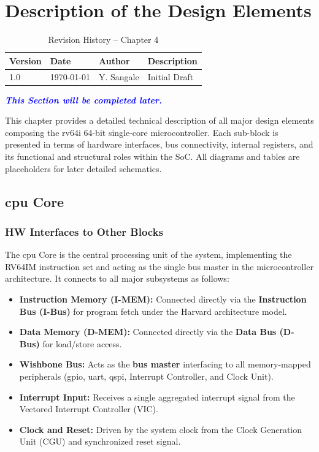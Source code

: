 \chapter{Description of the Design Elements}
\label{chap:design_elements}

\begin{table}[H]
\caption{Revision History – Chapter 4}
\centering
\begin{tabular}{llll}
\toprule
Version & Date & Author & Description \\
\midrule
1.0 & \today & Y. Sangale & Initial Draft \\
\bottomrule
\end{tabular}
\end{table}

\textcolor{blue}{\textbf{\textit{This Section will be completed later.}}}

This chapter provides a detailed technical description of all major design elements composing the \gls{rv64i}
64-bit single-core microcontroller.  
Each sub-block is presented in terms of hardware interfaces, bus connectivity, internal registers, 
and its functional and structural roles within the \gls{SoC}.  
All diagrams and tables are placeholders for later detailed schematics.

\section{\gls{cpu} Core}

\subsection{HW Interfaces to Other Blocks}
The \gls{cpu} Core is the central processing unit of the system, implementing the RV64IM instruction set
and acting as the single bus master in the microcontroller architecture.  
It connects to all major subsystems as follows:
\begin{itemize}
    \item \textbf{Instruction Memory (\gls{I-MEM}):} Connected directly via the \textbf{Instruction Bus (I-Bus)} 
          for program fetch under the \gls{Harvard} architecture model.
    \item \textbf{Data Memory (\gls{D-MEM}):} Connected directly via the \textbf{Data Bus (D-Bus)} for load/store access.
    \item \textbf{Wishbone Bus:} Acts as the \textbf{bus master} interfacing to all memory-mapped peripherals 
          (\gls{gpio}, \gls{uart}, \gls{qspi}, Interrupt Controller, and Clock Unit).
    \item \textbf{Interrupt Input:} Receives a single aggregated interrupt signal from the Vectored Interrupt Controller (VIC).
    \item \textbf{Clock and Reset:} Driven by the system clock from the Clock Generation Unit (CGU) and 
          synchronized reset signal.
\end{itemize}

